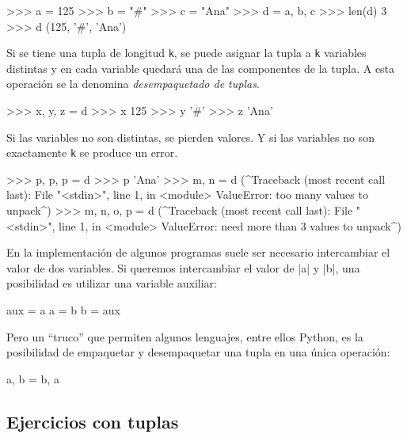 \begin{codigo-python-sn}
>>> a = 125
>>> b = "#"
>>> c = "Ana"
>>> d = a, b, c
>>> len(d)
3
>>> d
(125, '#', 'Ana')
\end{codigo-python-sn}

Si se tiene una tupla de longitud \lstinline+k+, se puede asignar
la tupla a \lstinline+k+ variables distintas y en cada variable quedará
una de las componentes de la tupla. A esta operación se la denomina
\emph{desempaquetado de tuplas}.

\begin{codigo-python-sn}
>>> x, y, z = d
>>> x
125
>>> y
'#'
>>> z
'Ana'
\end{codigo-python-sn}

\begin{atencion}
Si las variables no son distintas, se pierden valores. Y si las variables
no son exactamente \lstinline+k+ se produce un error.

\begin{codigo-python-sn}
>>> p, p, p = d
>>> p
'Ana'
>>> m, n = d
(^Traceback (most recent call last):
  File "<stdin>", line 1, in <module>
ValueError: too many values to unpack^)
>>> m, n, o, p = d
(^Traceback (most recent call last):
  File "<stdin>", line 1, in <module>
ValueError: need more than 3 values to unpack^)
\end{codigo-python-sn}
\end{atencion}

\begin{sabias_que}
En la implementación de algunos programas suele ser necesario intercambiar el
valor de dos variables. Si queremos intercambiar el valor de |a| y |b|, una
posibilidad es utilizar una variable auxiliar:

\begin{codigo-python-sn}
aux = a
a = b
b = aux
\end{codigo-python-sn}

Pero un ``truco'' que permiten algunos lenguajes, entre ellos Python, es la
posibilidad de empaquetar y desempaquetar una tupla en una única operación:

\begin{codigo-python-sn}
a, b = b, a
\end{codigo-python-sn}
\end{sabias_que}

\subsection{Ejercicios con tuplas}

